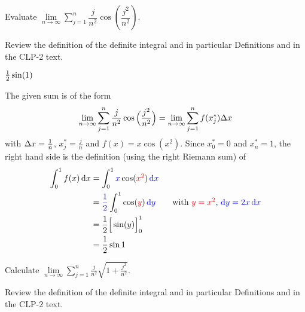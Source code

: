 
\begin{question}[2001A]
 Evaluate $\displaystyle\lim\limits_{n\rightarrow\infty}
\sum\limits_{j=1}^n \dfrac{j}{n^2}\cos\left(\dfrac{j^2}{n^2}\right)$.
\end{question}

\begin{hint}
Review the definition of the definite integral and in particular
Definitions    and
                  in the
CLP-2 text.
\end{hint}

\begin{answer}
$\tfrac{1}{2}\sin(1)$
\end{answer}

\begin{solution}
The given sum is of the form
\begin{align*}
\lim_{n\rightarrow\infty}\sum_{j=1}^n
\frac{j}{n^2}\cos\Big(\frac{j^2}{n^2}\Big)
=\lim_{n\rightarrow\infty}\sum_{j=1}^n f(x_j^*)\Delta x
\end{align*}
with $\Delta x=\frac{1}{n}$, $x_j^*=\frac{j}{n}$ and $f(x)=x\cos(x^2)$.
Since $x_0^*=0$ and $x_n^*=1$, the right hand side is the definition
(using the right Riemann sum) of
\begin{align*}
\int_0^1 f(x)\,\mathrm{d}x
&=\int_0^1 \textcolor{blue}{x}\cos(\textcolor{red}{x^2})\,\textcolor{blue}{\mathrm{d}x} \\
&=\textcolor{blue}{\frac{1}{2}}\int_0^1 \cos(\textcolor{red}{y})\,\textcolor{blue}{\mathrm{d}y }\qquad\text{with $\textcolor{red}{y=x^2}$, $\textcolor{blue}{\mathrm{d}y=2x\,\mathrm{d}x}$} \\
&=\frac{1}{2}\Big[\sin(y)\Big]_0^1 \\
&=\frac{1}{2}\sin 1
\end{align*}

\end{solution}



\begin{question}[2001D]
Calculate $\displaystyle\lim\limits_{n\rightarrow\infty}\sum\limits_{j=1}^n
\frac{j}{n^2}\sqrt{1+\frac{j^2}{n^2}}$.
\end{question}

\begin{hint}
Review the definition of the definite integral and in particular
Definitions    and
                  in the
CLP-2 text.
\end{hint}


